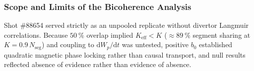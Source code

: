\subsubsection{Scope and Limits of the Bicoherence Analysis}
Shot \#88654 served strictly as an unpooled replicate without divertor Langmuir correlations. Because $50~\%$ overlap implied $K_{\mathrm{eff}} < K$ ($\approx 89~\%$ segment sharing at $K = 0.9\,N_{\mathrm{seg}}$) and coupling to $\mathrm{d}W_p/\mathrm{d}t$ was untested, positive $b_0$ established quadratic magnetic phase locking rather than causal transport, and null results reflected absence of evidence rather than evidence of absence.
